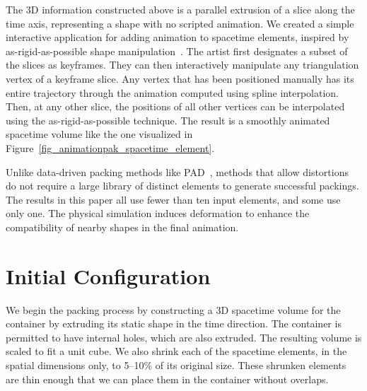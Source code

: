 The 3D information constructed above is a parallel extrusion of a 
slice along the time axis, representing a shape with no scripted animation.
We created a simple interactive application for adding animation to
spacetime elements, inspired by as-rigid-as-possible shape
manipulation~\cite{Igarashi2005}.  The artist first designates a subset
of the slices as keyframes.  They can then interactively manipulate
any triangulation vertex of a keyframe slice.  Any vertex that has
been positioned manually has its entire trajectory through the animation
computed using spline interpolation.  Then, at any other slice, the positions
of all other vertices can be interpolated using the as-rigid-as-possible
technique.  The result is a smoothly animated spacetime volume like the one
visualized in Figure~\ref{fig_animationpak_spacetime_element}.

Unlike data-driven packing methods like PAD~\cite{Kwan2016}, methods that
allow distortions do not require a large library of distinct elements
to generate successful packings.  The results in this paper all use
fewer than ten input elements, and some use only one.
The physical simulation induces deformation to enhance 
the compatibility of nearby shapes in the final animation.

\section{Initial Configuration}
\label{animationpak_initial_configuration}



We begin the packing process by constructing a 3D spacetime volume for
the container by extruding its static shape in
the time direction.  The container is 
permitted to have internal holes, which are also extruded.  
The resulting volume is scaled to fit a unit cube.
We also shrink each of the spacetime elements, in the spatial dimensions
only, to 5--10\% of its original size.  These shrunken elements are 
thin enough that we can place them in the container without overlaps.



